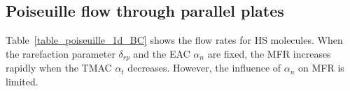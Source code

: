 
%


\subsection{Poiseuille flow through parallel plates} 

Table~\ref{table_poiseuille_1d_BC} shows the flow rates for HS molecules. When the rarefaction parameter $\delta_{rp}$ and the EAC  $\alpha _{n}$ are fixed, the MFR increases rapidly when the TMAC $\alpha _{t}$ decreases. However, the influence of $\alpha _{n}$ on MFR is limited. 


	

